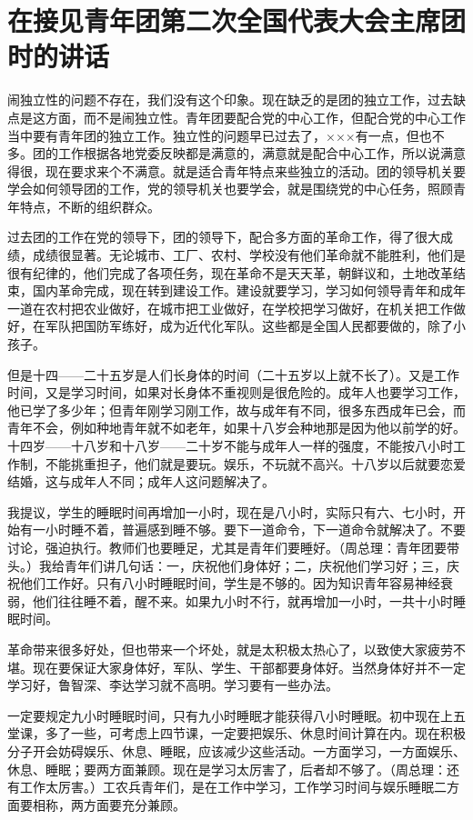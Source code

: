 \section[在接见青年团第二次全国代表大会主席团时的讲话（一九五三年七月）]{在接见青年团第二次全国代表大会主席团时的讲话}


闹独立性的问题不存在，我们没有这个印象。现在缺乏的是团的独立工作，过去缺点是这方面，而不是闹独立性。青年团要配合党的中心工作，但配合党的中心工作当中要有青年团的独立工作。独立性的问题早已过去了，×××有一点，但也不多。团的工作根据各地党委反映都是满意的，满意就是配合中心工作，所以说满意得很，现在要求来个不满意。就是适合青年特点来些独立的活动。团的领导机关要学会如何领导团的工作，党的领导机关也要学会，就是围绕党的中心任务，照顾青年特点，不断的组织群众。

过去团的工作在党的领导下，团的领导下，配合多方面的革命工作，得了很大成绩，成绩很显著。无论城市、工厂、农村、学校没有他们革命就不能胜利，他们是很有纪律的，他们完成了各项任务，现在革命不是天天革，朝鲜议和，土地改革结束，国内革命完成，现在转到建设工作。建设就要学习，学习如何领导青年和成年一道在农村把农业做好，在城市把工业做好，在学校把学习做好，在机关把工作做好，在军队把国防军练好，成为近代化军队。这些都是全国人民都要做的，除了小孩子。

但是十四——二十五岁是人们长身体的时间（二十五岁以上就不长了）。又是工作时间，又是学习时间，如果对长身体不重视则是很危险的。成年人也要学习工作，他已学了多少年；但青年刚学习刚工作，故与成年有不同，很多东西成年已会，而青年不会，例如种地青年就不如老年，如果十八岁会种地那是因为他以前学的好。十四岁——十八岁和十八岁——二十岁不能与成年人一样的强度，不能按八小时工作制，不能挑重担子，他们就是要玩。娱乐，不玩就不高兴。十八岁以后就要恋爱结婚，这与成年人不同；成年人这问题解决了。

我提议，学生的睡眠时间再增加一小时，现在是八小时，实际只有六、七小时，开始有一小时睡不着，普遍感到睡不够。要下一道命令，下一道命令就解决了。不要讨论，强迫执行。教师们也要睡足，尤其是青年们要睡好。（周总理：青年团要带头。）我给青年们讲几句话：一，庆祝他们身体好；二，庆祝他们学习好；三，庆祝他们工作好。只有八小时睡眠时间，学生是不够的。因为知识青年容易神经衰弱，他们往往睡不着，醒不来。如果九小时不行，就再增加一小时，一共十小时睡眠时间。

革命带来很多好处，但也带来一个坏处，就是太积极太热心了，以致使大家疲劳不堪。现在要保证大家身体好，军队、学生、干部都要身体好。当然身体好并不一定学习好，鲁智深、李达学习就不高明。学习要有一些办法。

一定要规定九小时睡眠时间，只有九小时睡眠才能获得八小时睡眠。初中现在上五堂课，多了一些，可考虑上四节课，一定要把娱乐、休息时间计算在内。现在积极分子开会妨碍娱乐、休息、睡眠，应该减少这些活动。一方面学习，一方面娱乐、休息、睡眠；要两方面兼顾。现在是学习太厉害了，后者却不够了。（周总理：还有工作太厉害。）工农兵青年们，是在工作中学习，工作学习时间与娱乐睡眠二方面要相称，两方面要充分兼顾。

